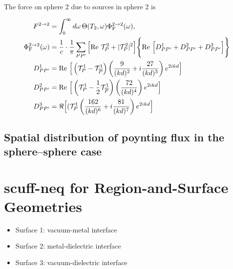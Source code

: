 \documentclass[letterpaper]{article}
\begin{document}
The force on sphere 2 due to sources in sphere 2 is

\begin{align*}
 F^{2\to 2}
&=
 \int_0^\infty d\omega \, \Theta(T_2,\omega) \Phi_{\text{\scriptsize F}}^{2\to 2}(\omega),
\\
 \Phi_{\text{\scriptsize F}}^{2\to 2}(\omega)
&= \frac{1}{c}
   \cdot
   \frac{1}{\pi}\sum_{P P^\prime}
   \Big[ \text{Re }\mathcal{T}^2_P + |\mathcal{T}^2_P|^2\Big]
   \Bigg\{
   \text{Re }
     \Big[ D^1_{PP^\prime} + D^2_{PP^\prime} + D^3_{PP^\prime} \Big]
   \Bigg\}
\\
 D^1_{PP^\prime}
 &=\text{Re }
   \Big[ \left(\mathcal{T}^1_P - \mathcal{T}^1_{\overline{P}}\right)
         \left(\frac{9}{(kd)^2} + i\frac{27}{(kd)^3}\right)
         e^{2ikd}
   \Big]
\\
 D^2_{PP^\prime}
 &=\text{Re }
   \Big[ \left(\mathcal{T}^1_P - \frac{1}{2}\mathcal{T}^1_{\overline{P}}\right)
         \left(\frac{72}{(kd)^4}\right)
         e^{2ikd}
   \Big]
\\
 D^3_{PP^\prime}
 &=\Re
   \Big[ (\mathcal{T}^1_P
         \left(\frac{162}{(kd)^6} + i\frac{81}{(kd)^7} \right)
         e^{2ikd}
   \Big]
\end{align*}

\subsection{Spatial distribution of poynting flux in the sphere--sphere case}

\newpage
\section{{\sc scuff-neq} for Region-and-Surface Geometries}

\begin{itemize}
 \item Surface 1: vacuum-metal interface
 \item Surface 2: metal-dielectric interface
 \item Surface 3: vacuum-dielectric interface
\end{itemize}
\end{document}
